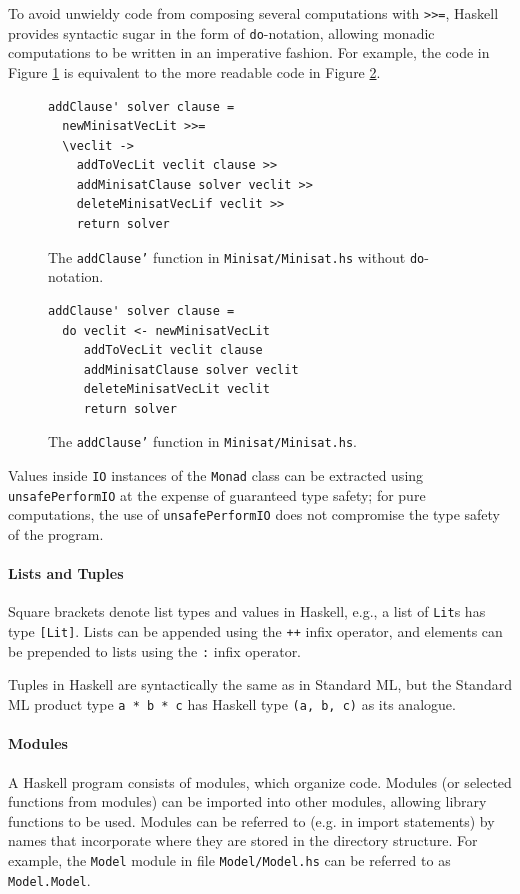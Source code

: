 \documentclass[12pt,a4paper,twoside,openright]{report}
\begin{document}
{To avoid unwieldy code from composing several
computations with \verb,>>=,, Haskell provides syntactic sugar
in the form of \verb,do,-notation, allowing monadic computations
to be written in an imperative fashion. For example, the code in Figure
\ref{monad} is equivalent to the more readable code in Figure \ref{do}.

\begin{figure}[t]
\centering
\begin{lstlisting}
addClause' solver clause =
  newMinisatVecLit >>=
  \veclit ->
    addToVecLit veclit clause >> 
    addMinisatClause solver veclit >>
    deleteMinisatVecLif veclit >>
    return solver
\end{lstlisting}
\caption{The {\tt addClause'} function in {\tt Minisat/Minisat.hs} without
{\tt do}-notation.}
\label{monad}
\end{figure}
\begin{figure}[t]
\centering
\begin{lstlisting}
addClause' solver clause =
  do veclit <- newMinisatVecLit
     addToVecLit veclit clause
     addMinisatClause solver veclit
     deleteMinisatVecLit veclit
     return solver
\end{lstlisting}
\caption{The {\tt addClause'} function in {\tt Minisat/Minisat.hs}.}
\label{do}
\end{figure}

Values inside \verb,IO, instances of the \verb,Monad, class can be extracted
using \verb,unsafePerformIO, at the expense of guaranteed type safety; for pure
computations, the use of \verb,unsafePerformIO, does not compromise the type
safety of the program.
}

\paragraph{Lists and Tuples}{
Square brackets denote list types and values in Haskell, e.g.,
a list of \verb,Lit,s has type \verb,[Lit],.
Lists can be appended using the \verb,++, infix operator, and elements
can be prepended to lists using the \verb,:, infix operator.

Tuples in Haskell are syntactically the same as in Standard ML, but the
Standard ML product type \verb,a * b * c, has Haskell type \verb.(a, b, c).
as its analogue.
}

\paragraph{Modules}{
A Haskell program consists of modules, which organize code.
Modules (or selected functions from modules) can be imported into other
modules, allowing library functions to be used. Modules can be referred
to (e.g. in import statements) by names that incorporate where they are
stored in the directory structure. For example, the \verb,Model, module in file
\verb,Model/Model.hs, can be referred to as \verb,Model.Model,.
}
\end{document}
